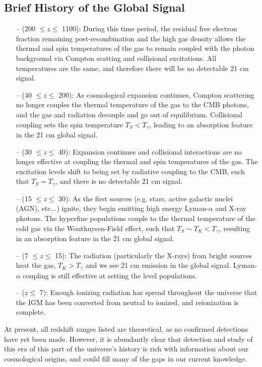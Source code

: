 \subsection{Brief History of the Global Signal}
\begin{itemize}
    \item[--] (200 $\leq z \leq$ 1100): During this time period, the residual 
     free electron fraction remaining post-recombination and the high gas 
     density allows the thermal and spin temperatures of the gas to remain 
     coupled with the photon background via Compton scatting and collisional 
     excitations. All temperatures are the same, and therefore there will be no 
     detectable 21 cm signal.
    \item[--] (40 $\leq z \leq$ 200): As cosmological expansion continues, 
     Compton scattering no longer couples the thermal temperature of the gas to 
     the CMB photons, and the gas and radiation decouple and go out of 
     equilibrium.  Collisional coupling sets the spin temperature $T_S < 
     T_\gamma$, leading to an absorption feature in the 21 cm global signal.  
    \item[--] (30 $\leq z \leq$ 40): Expansion continues and collisional 
     interactions are no longer effective at coupling the thermal and spin 
     temperatures of the gas. The excitation levels shift to being set by 
     radiative coupling to the CMB, such that $T_S = T_\gamma$, and there is no 
     detectable 21 cm signal.
    \item[--] (15 $\leq z \leq$ 30): As the first sources (e.g. stars, active 
     galactic nuclei (AGN), etc...) ignite, they begin emitting high energy 
     Lyman-$\alpha$ and X-ray photons. The hyperfine populations couple to the 
     thermal temperature of the cold gas via the Wouthuysen-Field effect, such 
     that $T_S \sim T_K < T_\gamma$, resulting in an absorption feature in the 
     21 cm global signal.
    \item[--] (7 $\leq z \leq$ 15): The radiation (particularly the X-rays) 
     from bright sources heat the gas, $T_K > T_\gamma$ and we see 21 cm 
     emission in the global signal. Lyman-$\alpha$ coupling is still effective 
     at setting the level populations.
    \item[--] ($z \leq$ 7): Enough ionizing radiation has spread throughout the 
     universe that the IGM has been converted from neutral to ionized, and 
     reionization is complete.
\end{itemize}

At present, all redshift ranges listed are theoretical, as no confirmed 
detections have yet been made. However, it is abundantly clear that detection 
and study of this era of this part of the universe's history is rich with 
information about our cosmological origins, and could fill many of the gaps in 
our current knowledge.

